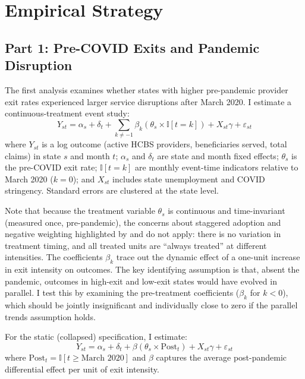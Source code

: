 \documentclass[12pt]{article}
\newcommand{\ind}{\mathbb{I}}
\begin{document}
\section{Empirical Strategy}

\subsection{Part 1: Pre-COVID Exits and Pandemic Disruption}

The first analysis examines whether states with higher pre-pandemic provider exit rates experienced larger service disruptions after March 2020. I estimate a continuous-treatment event study:
\begin{equation}
Y_{st} = \alpha_s + \delta_t + \sum_{k \neq -1} \beta_k \left( \theta_s \times \ind[t = k] \right) + X_{st} \gamma + \varepsilon_{st}
\label{eq:eventstudy}
\end{equation}
where $Y_{st}$ is a log outcome (active HCBS providers, beneficiaries served, total claims) in state $s$ and month $t$; $\alpha_s$ and $\delta_t$ are state and month fixed effects; $\theta_s$ is the pre-COVID exit rate; $\ind[t = k]$ are monthly event-time indicators relative to March 2020 ($k = 0$); and $X_{st}$ includes state unemployment and COVID stringency. Standard errors are clustered at the state level.

Note that because the treatment variable $\theta_s$ is continuous and time-invariant (measured once, pre-pandemic), the concerns about staggered adoption and negative weighting highlighted by \citet{goodmanbacon2021} and \citet{callaway2021} do not apply: there is no variation in treatment timing, and all treated units are ``always treated'' at different intensities. The coefficients $\beta_k$ trace out the dynamic effect of a one-unit increase in exit intensity on outcomes. The key identifying assumption is that, absent the pandemic, outcomes in high-exit and low-exit states would have evolved in parallel. I test this by examining the pre-treatment coefficients ($\beta_k$ for $k < 0$), which should be jointly insignificant and individually close to zero if the parallel trends assumption holds.

For the static (collapsed) specification, I estimate:
\begin{equation}
Y_{st} = \alpha_s + \delta_t + \beta \left( \theta_s \times \text{Post}_{t} \right) + X_{st} \gamma + \varepsilon_{st}
\label{eq:did}
\end{equation}
where $\text{Post}_t = \ind[t \geq \text{March 2020}]$ and $\beta$ captures the average post-pandemic differential effect per unit of exit intensity.
\end{document}
